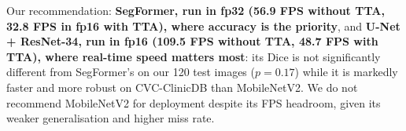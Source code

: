 Our recommendation: \textbf{SegFormer, run in fp32 (56.9 FPS without TTA, 32.8 FPS in fp16 with TTA), where
accuracy is the priority}, and \textbf{U-Net + ResNet-34, run in fp16 (109.5 FPS without TTA, 48.7 FPS with
TTA), where real-time speed matters most}: its Dice is not significantly different from SegFormer's on
our 120 test images ($p = 0.17$) while it is markedly faster and more robust on CVC-ClinicDB than MobileNetV2.
We do not recommend MobileNetV2 for deployment despite its FPS headroom, given its weaker generalisation and
higher miss rate.

